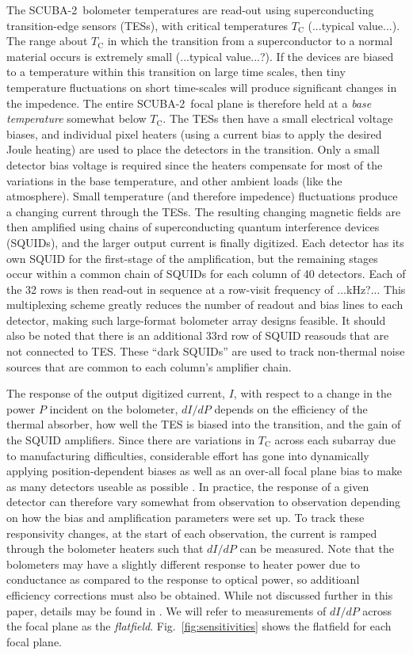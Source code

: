 \documentclass[useAMS,usenatbib,nofootinbib]{mn2e}
\newcommand{\scuba}{SCUBA-2}
\begin{document}
The \scuba\ bolometer temperatures are read-out using superconducting
transition-edge sensors (TESs), with critical temperatures
$T_\mathrm{C}$ (...typical value...). The range about $T_\mathrm{C}$
in which the transition from a superconductor to a normal material
occurs is extremely small (...typical value...?). If the devices are
biased to a temperature within this transition on large time scales,
then tiny temperature fluctuations on short time-scales will produce
significant changes in the impedence. The entire \scuba\ focal plane
is therefore held at a \emph{base temperature} somewhat below
$T_\mathrm{C}$. The TESs then have a small electrical voltage biases,
and individual pixel heaters (using a current bias to apply the
desired Joule heating) are used to place the detectors in the
transition. Only a small detector bias voltage is required since the
heaters compensate for most of the variations in the base temperature,
and other ambient loads (like the atmosphere).  Small temperature (and
therefore impedence) fluctuations produce a changing current through
the TESs. The resulting changing magnetic fields are then amplified
using chains of superconducting quantum interference devices (SQUIDs),
and the larger output current is finally digitized. Each detector has
its own SQUID for the first-stage of the amplification, but the
remaining stages occur within a common chain of SQUIDs for each column
of 40 detectors. Each of the 32 rows is then read-out in sequence at a
row-visit frequency of ...kHz?... This multiplexing scheme greatly
reduces the number of readout and bias lines to each detector, making
such large-format bolometer array designs feasible. It should also be
noted that there is an additional 33rd row of SQUID reasouds that are
not connected to TES. These ``dark SQUIDs'' are used to track
non-thermal noise sources that are common to each column's amplifier
chain.

The response of the output digitized current, $I$, with respect to a
change in the power $P$ incident on the bolometer, $dI/dP$ depends on
the efficiency of the thermal absorber, how well the TES is biased
into the transition, and the gain of the SQUID amplifiers. Since there
are variations in $T_\mathrm{C}$ across each subarray due to
manufacturing difficulties, considerable effort has gone into
dynamically applying position-dependent biases as well as an over-all
focal plane bias to make as many detectors useable as possible
\citep{holland2012}. In practice, the response of a given detector can
therefore vary somewhat from observation to observation depending on
how the bias and amplification parameters were set up. To track these
responsivity changes, at the start of each observation, the current is
ramped through the bolometer heaters such that $dI/dP$ can be
measured. Note that the bolometers may have a slightly different
response to heater power due to conductance as compared to the
response to optical power, so additioanl efficiency corrections must
also be obtained. While not discussed further in this paper, details
may be found in \citet{dempsey2012}. We will refer to measurements of
$dI/dP$ across the focal plane as the
\emph{flatfield}. Fig.~\ref{fig:sensitivities} shows the flatfield for
each focal plane.
\end{document}
